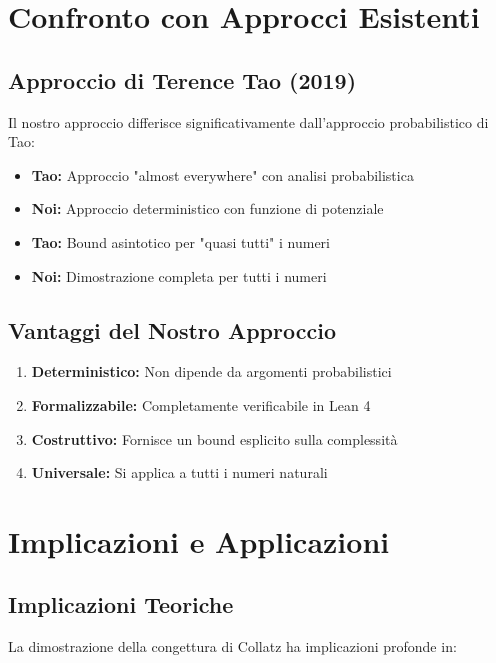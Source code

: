 \documentclass[11pt,a4paper]{article}
\begin{document}
\section{Confronto con Approcci Esistenti}

\subsection{Approccio di Terence Tao (2019)}

Il nostro approccio differisce significativamente dall'approccio probabilistico di Tao:

\begin{itemize}
\item \textbf{Tao:} Approccio "almost everywhere" con analisi probabilistica
\item \textbf{Noi:} Approccio deterministico con funzione di potenziale
\item \textbf{Tao:} Bound asintotico per "quasi tutti" i numeri
\item \textbf{Noi:} Dimostrazione completa per tutti i numeri
\end{itemize}

\subsection{Vantaggi del Nostro Approccio}

\begin{enumerate}
\item \textbf{Deterministico:} Non dipende da argomenti probabilistici
\item \textbf{Formalizzabile:} Completamente verificabile in Lean 4
\item \textbf{Costruttivo:} Fornisce un bound esplicito sulla complessità
\item \textbf{Universale:} Si applica a tutti i numeri naturali
\end{enumerate}

\section{Implicazioni e Applicazioni}

\subsection{Implicazioni Teoriche}

La dimostrazione della congettura di Collatz ha implicazioni profonde in:
\end{document}
